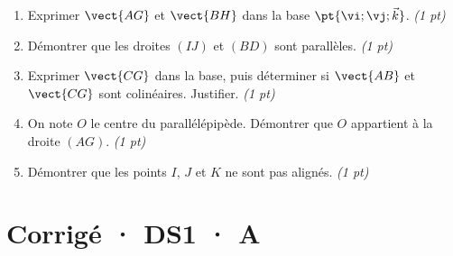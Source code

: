 \begin{enumerate}

\item Exprimer $\vect{AG}$ et $\vect{BH}$ dans la base $\pt{\vi;\vj;\vec k}$. \hfill\textit{(1 pt)}

\item Démontrer que les droites $(IJ)$ et $(BD)$ sont parallèles. \hfill\textit{(1 pt)}

\item Exprimer $\vect{CG}$ dans la base, puis déterminer si $\vect{AB}$ et $\vect{CG}$ sont colinéaires. Justifier. \hfill\textit{(1 pt)}

\item On note $O$ le centre du parallélépipède. Démontrer que $O$ appartient à la droite $(AG)$. \hfill\textit{(1 pt)}

\item Démontrer que les points $I$, $J$ et $K$ ne sont pas alignés. \hfill\textit{(1 pt)}

\end{enumerate}

\ifmxteacher\mxnewpage

\section*{Corrigé · DS1 · A}\label{cor:1-3}

